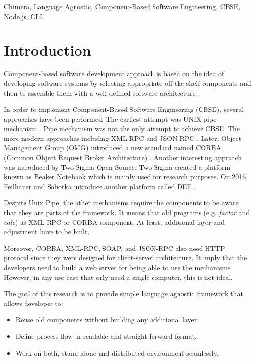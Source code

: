 \documentclass[conference]{IEEEtran}
\begin{document}
\begin{IEEEkeywords}
Chimera, Language Agnostic, Component-Based Software Engineering, CBSE, Node.js, CLI.
\end{IEEEkeywords}

\IEEEpeerreviewmaketitle

\section{Introduction}

Component-based software development approach is based on the idea of developing 
software systems by selecting appropriate off-the shelf components and then to 
assemble them with a well-defined software architecture \cite{kaur2010component}.

In order to implement Component-Based Software Engineering (CBSE), several 
approaches have been performed. The earliest attempt was UNIX pipe mechanism 
\cite{mcilroy1968mass}. Pipe mechanism was not the only attempt to achieve CBSE.
The more modern approaches including XML-RPC \cite{xmlrpc} and JSON-RPC \cite{jsonrpc}. 
Later, Object Management Group (OMG) introduced a new standard named CORBA (Common
Object Request Broker Architecture) \cite{corba}. Another interesting approach was 
introduced by Two Sigma Open Source. Two Sigma created a platform known as Beaker
Notebook \cite{beakernotebook} which is mainly used for research purposes. 
On 2016, Feilhauer and Sobotka introduce another platform called DEF 
\cite{feilhauer2016def}.

Despite Unix Pipe, the other mechanisms require the components to be aware that 
they are parts of the framework. It means that old programs (e.g.
{\it factor} and {\it calc}) as XML-RPC or CORBA component. At least, additional layer
and adjustment have to be built.

Moreover, CORBA, XML-RPC, SOAP, and JSON-RPC also need HTTP protocol since they were designed for 
client-server architecture. It imply that the developers need to build a web server for being able 
to use the mechanisms. However, in any use-case that only need a single computer,
this is not ideal.

The goal of this research is to provide simple language agnostic framework that allows developer to:

\begin{itemize}
    \item Reuse old components without building any additional layer.
    \item Define process flow in readable and straight-forward format.
    \item Work on both, stand alone and distributed environment seamlessly.
\end{itemize}
\end{document}
